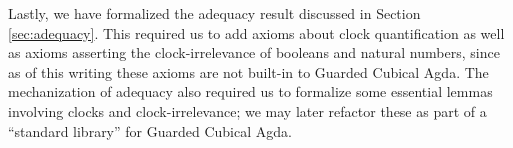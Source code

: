 
Lastly, we have formalized the adequacy result discussed in Section
\ref{sec:adequacy}. This required us to add axioms about clock quantification as
well as axioms asserting the clock-irrelevance of booleans and natural numbers,
since as of this writing these axioms are not built-in to Guarded Cubical Agda.
The mechanization of adequacy also required us to formalize some essential
lemmas involving clocks and clock-irrelevance; we may later refactor these as
part of a ``standard library'' for Guarded Cubical Agda.

